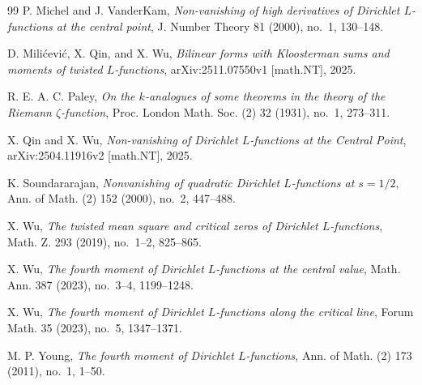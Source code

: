 \documentclass[12pt, a4paper]{amsart}
\numberwithin{equation}{section}
\theoremstyle{plain}
\begin{document}
\begin{thebibliography}{99}
P. Michel and J. VanderKam,
\emph{Non-vanishing of high derivatives of Dirichlet $L$-functions at the
central point},
J. Number Theory 81 (2000), no.~1, 130--148.

D. Mili\'cevi\'c, X. Qin, and X. Wu,
\emph{Bilinear forms with Kloosterman sums and moments of twisted
$L$-functions},
arXiv:2511.07550v1 [math.NT], 2025.

R. E. A. C. Paley,
\emph{On the $k$-analogues of some theorems in the theory of the Riemann
$\zeta$-function},
Proc. London Math. Soc. (2) 32 (1931), no.~1, 273--311.

X. Qin and X. Wu,
\emph{Non-vanishing of Dirichlet $L$-functions at the Central Point},
arXiv:2504.11916v2 [math.NT], 2025.

K. Soundararajan,
\emph{Nonvanishing of quadratic Dirichlet $L$-functions at $s=1/2$},
Ann. of Math. (2) 152 (2000), no.~2, 447--488.

X. Wu, \emph{The twisted mean square and critical zeros of Dirichlet $L$-functions}, Math. Z. 293 (2019), no.~1--2, 825--865.

X. Wu, \emph{The fourth moment of Dirichlet $L$-functions at the central value}, Math. Ann. 387 (2023), no.~3--4, 1199--1248.

X. Wu, \emph{The fourth moment of Dirichlet $L$-functions along the critical line}, Forum Math. 35 (2023), no.~5, 1347--1371.

M. P. Young, \emph{The fourth moment of Dirichlet $L$-functions}, Ann. of Math. (2) 173 (2011), no.~1, 1--50.

\end{thebibliography}
\end{document}
